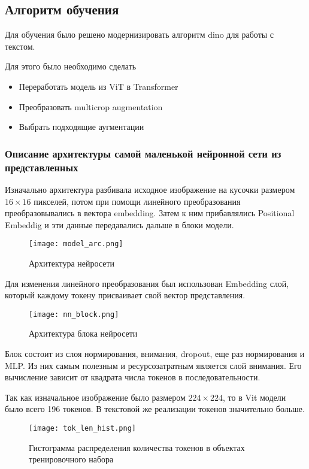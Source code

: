 \documentclass[../part_2.tex]{subfiles}
\begin{document}
    \subsection{Алгоритм обучения}
    \par Для обучения было решено модернизировать алгоритм dino для работы с текстом.
    \par Для этого было необходимо сделать
    \begin{itemize}
        \item Переработать модель из ViT в Transformer
        \item Преобразовать multicrop augmentation
        \item Выбрать подходящие аугментации
    \end{itemize}
    \subsubsection{Описание архитектуры самой маленькой нейронной сети из представленных}    
    \par Изначально архитектура разбивала исходное изображение на кусочки размером $16\times16$ пикселей, потом при помощи линейного преобразования преобразовывались в вектора embedding. Затем к ним прибавлялись Positional Embeddig и эти данные передавались дальше в блоки модели.
    \begin{figure}[H]
        \centering
        \texttt{[image: model\_arc.png]}
        \caption{Архитектура нейросети}
        \label{fig:model_arc}
    \end{figure}
    \par Для изменения линейного преобразования был использован Embedding слой, который каждому токену присваивает свой вектор представления.
    \begin{figure}[H]
        \centering
        \texttt{[image: nn\_block.png]}
        \caption{Архитектура блока нейросети}
        \label{fig:nn_block}
    \end{figure}
    \par Блок состоит из слоя нормирования, внимания, dropout, еще раз нормирования и MLP. Из них самым полезным и ресурсозатратным является слой внимания. Его вычисление зависит от квадрата числа токенов в последовательности.
    \par Так как изначальное изображение было размером $224\times224$, то в Vit модели было всего 196 токенов. В текстовой же реализации токенов значительно больше.
    \begin{figure}[H]
        \centering
        \texttt{[image: tok\_len\_hist.png]}
        \caption{Гистограмма распределения количества токенов в объектах тренировочного набора}
        \label{fig:tok_len_hist}
    \end{figure}
\end{document}
